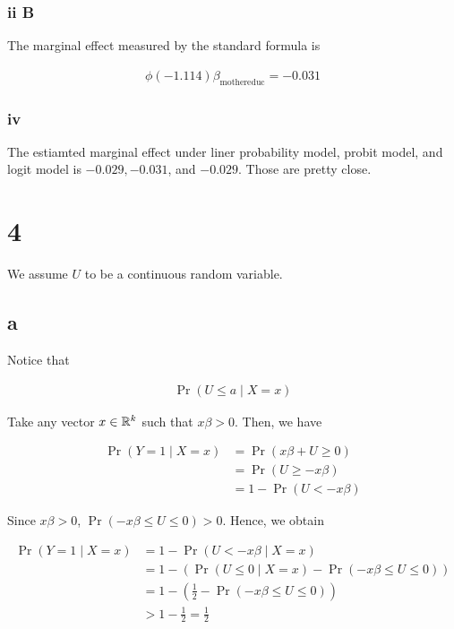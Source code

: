\documentclass[11pt]{article}
\begin{document}
\subsubsection*{ii B}

The marginal effect measured by the standard formula is

\begin{align*}
    \phi(-1.114) \beta_{\text{mothereduc}} = -0.031
\end{align*}

\subsubsection*{iv}

The estiamted marginal effect under liner probability model, probit model, and logit model is $-0.029, -0.031$, and $-0.029$. Those are pretty close.

\section*{4}

We assume $U$ to be a continuous random variable.

\subsection*{a}\label{q:4_a}

Notice that

\begin{align*}
    \Pr(U \leq a \mid X = x)
\end{align*}

Take any vector $x\in \mathbb{R}^k$ such that $x\beta > 0$. Then, we have

\begin{align*}
    \Pr(Y = 1 \mid X = x)
    &= \Pr(x\beta + U \geq 0) \\
    &= \Pr(U \geq - x\beta) \\
    &= 1 - \Pr(U < - x\beta)
\end{align*}

Since $x\beta > 0$, $\Pr(- x\beta \leq U \leq 0) > 0$. Hence, we obtain

\begin{align*}
    \Pr(Y = 1 \mid X = x)
    &= 1 - \Pr(U < - x\beta \mid X = x) \\
    &= 1 - \left( \Pr(U \leq 0 \mid X = x) - \Pr(- x\beta \leq U \leq 0) \right) \\
    &= 1 - \left( \frac{1}{2} - \Pr(- x\beta \leq U \leq 0) \right) \\
    &> 1 - \frac{1}{2} = \frac{1}{2}
\end{align*}
\end{document}
